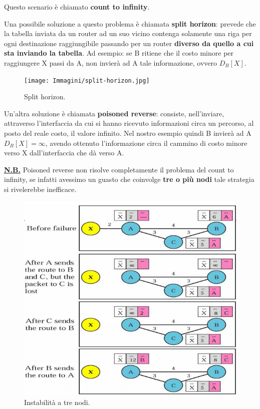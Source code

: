 \documentclass[11pt,a4paper,oneside]{book}
\theoremstyle{definition}
\begin{document}
Questo scenario è chiamato \textbf{count to infinity}.

Una possibile soluzione a questo problema è chiamata \textbf{split horizon}: prevede che la tabella inviata da un router ad un suo vicino contenga solamente una riga per ogni destinazione raggiungibile passando per un router \textbf{diverso da quello a cui sta inviando la tabella}. Ad esempio: se B ritiene che il costo minore per raggiungere X passi da A, non invierà ad A tale informazione, ovvero $D_{B}[X]$.

\begin{figure}[!h]
	\centering
	\texttt{[image: Immagini/split-horizon.jpg]}
	\caption{Split horizon.}
\end{figure}

\pagebreak

Un'altra soluzione è chiamata \textbf{poisoned reverse}: consiste, nell'inviare, attraverso l'interfaccia da cui si hanno ricevuto informazioni circa un percorso, al posto del reale costo, il valore infinito. Nel nostro esempio quindi B invierà ad A $D_{B}[X] = \infty$, avendo ottenuto l'informazione circa il cammino di costo minore verso X dall'interfaccia che dà verso A.

\textbf{\underline{N.B.}} Poisoned reverse non risolve completamente il problema del count to infinity, se infatti avessimo un guasto che coinvolge \textbf{tre o più nodi} tale strategia si rivelerebbe inefficace.

\begin{figure}[!h]
	\centering
	\includegraphics[scale=0.35]{Immagini/Three_nodes.png}
	\caption{Instabilità a tre nodi.}
\end{figure}
\end{document}
